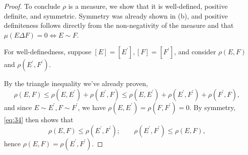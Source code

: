 \documentclass[12pt]{article}
\newenvironment{problem}[2][Problem]{\begin{trivlist}
    \item[\hskip \labelsep {\bfseries #1}\hskip \labelsep {\bfseries #2.}]}{\end{trivlist}}
\theoremstyle{definition}
\begin{document}
\begin{problem}{1.3.12}
\begin{enumerate}[label=(\alph*)]
\begin{proof}
			      To conclude \(\rho\) is a measure, we show that it is well-defined, positive definite, and symmetric.
			      Symmetry was already shown in (b), and positive definiteness follows directly from the non-negativity of the measure and that \(\mu(E \Delta F) = 0 \iff E \sim F\).

			      For well-definedness, suppose \( [E] = [E^{\prime}], [F] = [F^{\prime}] \), and consider \( \rho(E,F) \) and \( \rho(E^{\prime}, F^{\prime}) \).

            By the triangle inequality we've already proven,
            \begin{equation}
            \label{eq:34}
            \rho(E,F) \leq \rho(E, E^{\prime}) + \rho(E^{\prime}, F) \leq \rho(E, E^{\prime}) + \rho(E^{\prime}, F^{\prime}) + \rho(F^{\prime}, F),
            \end{equation}
            and since \( E \sim E^{\prime}, F \sim F^{\prime} \), we have \(\rho(E, E^{\prime}) = \rho(F, F^{\prime}) = 0\).
            By symmetry, \cref{eq:34} then shows that
            \begin{equation}
            \label{eq:36}
            \rho(E,F) \leq \rho(E^{\prime}, F^{\prime}); \qquad \rho(E^{\prime}, F^{\prime}) \leq \rho(E,F),
            \end{equation}
            hence \(\rho(E, F) = \rho(E^{\prime}, F^{\prime})\).
		      \end{proof}
	\end{enumerate}
\end{problem}
\end{document}
